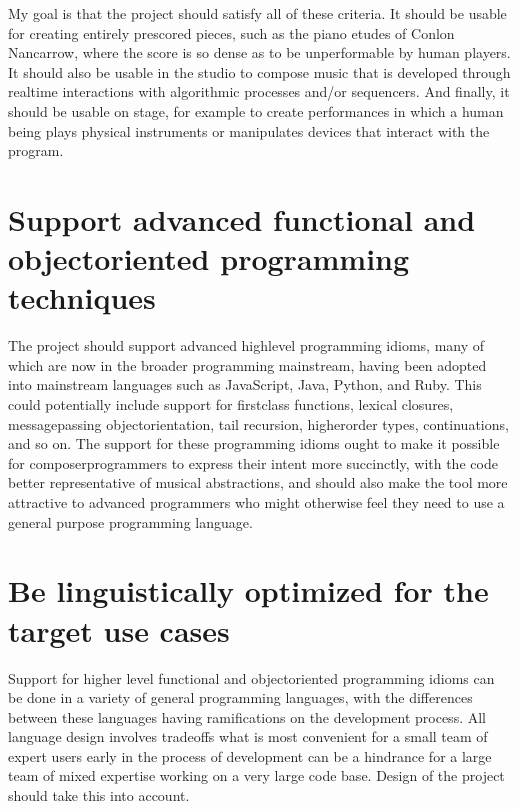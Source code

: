 \documentclass[letterpaper,10pt,english]{sphinxmanual}
\begin{document}
\sphinxAtStartPar
My goal is that the project should satisfy all of these criteria.
It should be usable for creating entirely pre\sphinxhyphen{}scored pieces, such as the piano etudes of Conlon Nancarrow,
where the score is so dense as to be unperformable by human players.
It should also be usable in the studio to compose music that is developed through realtime interactions with
algorithmic processes and/or sequencers.
And finally, it should be usable on stage, for example to create performances in which a human being plays
physical instruments or manipulates devices that interact with the program.


\section{Support advanced functional and object\sphinxhyphen{}oriented programming techniques}
\label{\detokenize{goals:support-advanced-functional-and-object-oriented-programming-techniques}}
\sphinxAtStartPar
The project should support advanced high\sphinxhyphen{}level programming idioms, many of which are now in the broader
programming mainstream, having been adopted into mainstream languages such as JavaScript, Java, Python, and Ruby.
This could potentially include support for first\sphinxhyphen{}class functions, lexical closures,
message\sphinxhyphen{}passing object\sphinxhyphen{}orientation, tail recursion, higher\sphinxhyphen{}order types, continuations, and so on.
The support for these programming idioms ought to make it possible for composer\sphinxhyphen{}programmers to express
their intent more succinctly, with the code better representative of musical abstractions, and should
also make the tool more attractive to advanced programmers who might otherwise
feel they need to use a general purpose programming language.


\section{Be linguistically optimized for the target use cases}
\label{\detokenize{goals:be-linguistically-optimized-for-the-target-use-cases}}
\sphinxAtStartPar
Support for higher level functional and object\sphinxhyphen{}oriented programming idioms can be done in a variety of
general programming languages, with the differences between these languages having ramifications on the development process.
All language design involves tradeoffs \sphinxhyphen{} what is most convenient for a small team of expert users early
in the process of development can be a hindrance for a large team of mixed expertise working on a very large code base.
Design of the project should take this into account.
\end{document}
